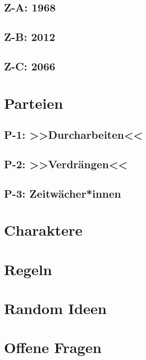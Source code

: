 \documentclass[12pt, a4paper, openany]{book}
\begin{document}
\section{Z-A: 1968}\label{sec:za}

\section{Z-B: 2012}\label{sec:zb}

\section{Z-C: 2066}\label{sec:zc}


\chapter{Parteien}

\section{P-1: >>Durcharbeiten<<}\label{sec:p1}

\section{P-2: >>Verdrängen<<}\label{sec:p2}

\section{P-3: Zeitwächer*innen}\label{sec:p3}


\chapter{Charaktere}


\chapter{Regeln}


\chapter{Random Ideen}


\chapter{Offene Fragen}\label{ch:offene_fragen}

\end{document}
